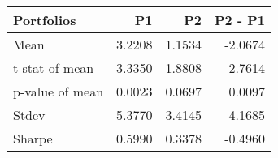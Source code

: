 \begin{tabular}{lrrr}
\toprule
Portfolios & P1 & P2 & P2 - P1 \\
\midrule
Mean & 3.2208 & 1.1534 & -2.0674 \\
t-stat of mean & 3.3350 & 1.8808 & -2.7614 \\
p-value of mean & 0.0023 & 0.0697 & 0.0097 \\
Stdev & 5.3770 & 3.4145 & 4.1685 \\
Sharpe & 0.5990 & 0.3378 & -0.4960 \\
\bottomrule
\end{tabular}
